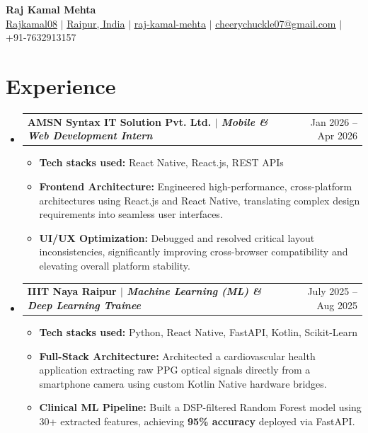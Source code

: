 \documentclass[letterpaper,11pt]{article}
\makeatletter
\newcommand{\resumeItem}[1]{
  \item\small{
    {#1 \vspace{-2pt}}
  }
}
\newcommand{\resumeSubheading}[2]{
  \vspace{-1pt}\item
    \begin{tabular*}{0.97\textwidth}[t]{l@{\extracolsep{\fill}}r}
      \textbf{#1} & #2 \\
    \end{tabular*}\vspace{-5pt}
}
\newcommand{\resumeSubHeadingListStart}{\begin{itemize}[leftmargin=0.15in, label={}]}
\newcommand{\resumeSubHeadingListEnd}{\end{itemize}\vspace{-4pt}}
\newcommand{\resumeItemListStart}{\begin{itemize}}
\newcommand{\resumeItemListEnd}{\end{itemize}\vspace{-5pt}}
\makeatother
\begin{document}
\begin{center}
    {\Huge \textbf{Raj Kamal Mehta}} \\ \vspace{5pt}
    \small 
    \href{https://github.com/Rajkamal08}{\underline{Rajkamal08}} $|$ 
    {\underline{Raipur, India}} $|$ 
    \href{https://linkedin.com/in/raj-kamal-mehta-105320269}{\underline{raj-kamal-mehta}} $|$ 
    \href{mailto:cheerychuckle07@gmail.com}{\underline{cheerychuckle07@gmail.com}} $|$ 
    +91-7632913157
\end{center}
\vspace{-6pt}

\section{Experience}
  \resumeSubHeadingListStart

    \resumeSubheading
      {AMSN Syntax IT Solution Pvt. Ltd. $|$ \normalfont\textit{Mobile \& Web Development Intern}}{Jan 2026 -- Apr 2026}
      \resumeItemListStart
        \resumeItem{\textbf{Tech stacks used:} React Native, React.js, REST APIs}
        \resumeItem{\textbf{Frontend Architecture:} Engineered high-performance, cross-platform architectures using React.js and React Native, translating complex design requirements into seamless user interfaces.}
        \resumeItem{\textbf{UI/UX Optimization:} Debugged and resolved critical layout inconsistencies, significantly improving cross-browser compatibility and elevating overall platform stability.}
      \resumeItemListEnd

    \resumeSubheading
       {IIIT Naya Raipur $|$ \normalfont\textit{Machine Learning (ML) \& Deep Learning Trainee}}{July 2025 -- Aug 2025}
      \resumeItemListStart
        \resumeItem{\textbf{Tech stacks used:} Python, React Native, FastAPI, Kotlin, Scikit-Learn}
        \resumeItem{\textbf{Full-Stack Architecture:} Architected a cardiovascular health application extracting raw PPG optical signals directly from a smartphone camera using custom Kotlin Native hardware bridges.}
        \resumeItem{\textbf{Clinical ML Pipeline:} Built a DSP-filtered Random Forest model using 30+ extracted features, achieving \textbf{95\% accuracy} deployed via FastAPI.}
      \resumeItemListEnd

  \resumeSubHeadingListEnd

\end{document}
